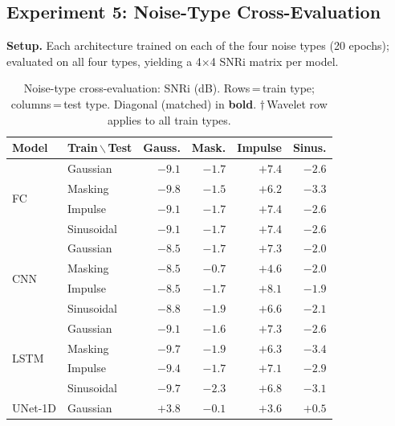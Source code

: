 \documentclass{article}
\begin{document}
\subsection{Experiment 5: Noise-Type Cross-Evaluation}
\label{sec:exp-noisetype}

\textbf{Setup.}
Each architecture trained on each of the four noise types (20 epochs);
evaluated on all four types, yielding a 4$\times$4 SNRi matrix per model.

\begin{table}[h]
\caption{Noise-type cross-evaluation: SNRi (dB).
Rows\,=\,train type; columns\,=\,test type.
Diagonal (matched) in \textbf{bold}.
$\dagger$\,Wavelet row applies to all train types.}
\label{tab:noise-types}
\vspace{-4pt}
\begin{center}
\small
\setlength{\tabcolsep}{4pt}
\begin{tabular}{ll|rrrr}
\toprule
\textbf{Model} & \textbf{Train\,$\backslash$\,Test} & Gauss. & Mask. & Impulse & Sinus. \\
\midrule
\multirow{4}{*}{FC}
  & Gaussian   & \textbf{$-9.1$} & $-1.7$ & $+7.4$ & $-2.6$ \\
  & Masking    & $-9.8$ & \textbf{$-1.5$} & $+6.2$ & $-3.3$ \\
  & Impulse    & $-9.1$ & $-1.7$ & \textbf{$+7.4$} & $-2.6$ \\
  & Sinusoidal & $-9.1$ & $-1.7$ & $+7.4$ & \textbf{$-2.6$} \\
\midrule
\multirow{4}{*}{CNN}
  & Gaussian   & \textbf{$-8.5$} & $-1.7$ & $+7.3$ & $-2.0$ \\
  & Masking    & $-8.5$ & \textbf{$-0.7$} & $+4.6$ & $-2.0$ \\
  & Impulse    & $-8.5$ & $-1.7$ & \textbf{$+8.1$} & $-1.9$ \\
  & Sinusoidal & $-8.8$ & $-1.9$ & $+6.6$ & \textbf{$-2.1$} \\
\midrule
\multirow{4}{*}{LSTM}
  & Gaussian   & \textbf{$-9.1$} & $-1.6$ & $+7.3$ & $-2.6$ \\
  & Masking    & $-9.7$ & \textbf{$-1.9$} & $+6.3$ & $-3.4$ \\
  & Impulse    & $-9.4$ & $-1.7$ & \textbf{$+7.1$} & $-2.9$ \\
  & Sinusoidal & $-9.7$ & $-2.3$ & $+6.8$ & \textbf{$-3.1$} \\
\midrule
\multirow{4}{*}{UNet-1D}
  & Gaussian   & \textbf{$+3.8$} & $-0.1$ & $+3.6$ & $+0.5$ \\

\end{tabular}
\end{center}
\end{table}
\end{document}

